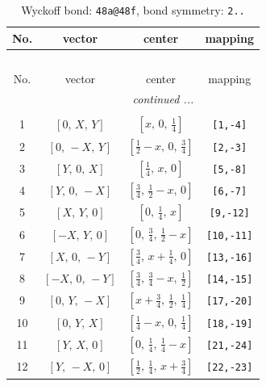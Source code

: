 \documentclass[fleqn,8pt]{jsarticle}
\begin{document}
\begin{longtable}{cccc}
\caption{Wyckoff bond: {\tt 48a@48f}, bond symmetry: {\tt 2..}}
 \\
 \hline \hline
No. & vector & center & mapping \\ \hline \endfirsthead

\multicolumn{3}{l}{\tablename\ \thetable{}} \\
 \hline \hline
No. & vector & center & mapping \\ \hline \endhead

 \hline \hline
\multicolumn{3}{r}{\footnotesize\it continued ...} \\ \endfoot

 \hline \hline
\multicolumn{3}{r}{} \\ \endlastfoot

1 & $\left[ 0,\, X,\, Y \right]$ & $\left[ x,\, 0,\, \frac{1}{4} \right]$ & {\tt [1,-4]} \\ \hline
2 & $\left[ 0,\, - X,\, Y \right]$ & $\left[ \frac{1}{2} - x,\, 0,\, \frac{3}{4} \right]$ & {\tt [2,-3]} \\ \hline
3 & $\left[ Y,\, 0,\, X \right]$ & $\left[ \frac{1}{4},\, x,\, 0 \right]$ & {\tt [5,-8]} \\ \hline
4 & $\left[ Y,\, 0,\, - X \right]$ & $\left[ \frac{3}{4},\, \frac{1}{2} - x,\, 0 \right]$ & {\tt [6,-7]} \\ \hline
5 & $\left[ X,\, Y,\, 0 \right]$ & $\left[ 0,\, \frac{1}{4},\, x \right]$ & {\tt [9,-12]} \\ \hline
6 & $\left[ - X,\, Y,\, 0 \right]$ & $\left[ 0,\, \frac{3}{4},\, \frac{1}{2} - x \right]$ & {\tt [10,-11]} \\ \hline
7 & $\left[ X,\, 0,\, - Y \right]$ & $\left[ \frac{3}{4},\, x + \frac{1}{4},\, 0 \right]$ & {\tt [13,-16]} \\ \hline
8 & $\left[ - X,\, 0,\, - Y \right]$ & $\left[ \frac{3}{4},\, \frac{3}{4} - x,\, \frac{1}{2} \right]$ & {\tt [14,-15]} \\ \hline
9 & $\left[ 0,\, Y,\, - X \right]$ & $\left[ x + \frac{3}{4},\, \frac{1}{2},\, \frac{1}{4} \right]$ & {\tt [17,-20]} \\ \hline
10 & $\left[ 0,\, Y,\, X \right]$ & $\left[ \frac{1}{4} - x,\, 0,\, \frac{1}{4} \right]$ & {\tt [18,-19]} \\ \hline
11 & $\left[ Y,\, X,\, 0 \right]$ & $\left[ 0,\, \frac{1}{4},\, \frac{1}{4} - x \right]$ & {\tt [21,-24]} \\ \hline
12 & $\left[ Y,\, - X,\, 0 \right]$ & $\left[ \frac{1}{2},\, \frac{1}{4},\, x + \frac{3}{4} \right]$ & {\tt [22,-23]} \\ \hline

\end{longtable}
\end{document}
